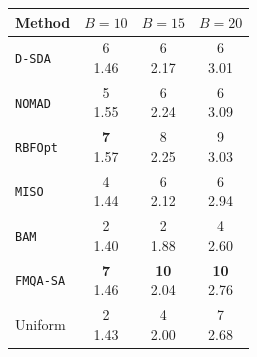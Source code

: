 \begin{tabular}{@{}lccc@{}}\toprule
Method & \(B=10\) & \(B=15\) & \(B=20\)\\\midrule
\texttt{D-SDA} & \makecell{6\\1.46} & \makecell{6\\2.17} & \makecell{6\\3.01} \\
\texttt{NOMAD} & \makecell{5\\1.55} & \makecell{6\\2.24} & \makecell{6\\3.09} \\
\texttt{RBFOpt} & \makecell{\textbf{7}\\1.57} & \makecell{8\\2.25} & \makecell{9\\3.03} \\
\texttt{MISO} & \makecell{4\\1.44} & \makecell{6\\2.12} & \makecell{6\\2.94} \\
\texttt{BAM} & \makecell{2\\1.40} & \makecell{2\\1.88} & \makecell{4\\2.60} \\
\texttt{FMQA-SA} & \makecell{\textbf{7}\\1.46} & \makecell{\textbf{10}\\2.04} & \makecell{\textbf{10}\\2.76} \\
Uniform & \makecell{2\\1.43} & \makecell{4\\2.00} & \makecell{7\\2.68} \\
\bottomrule\end{tabular}
